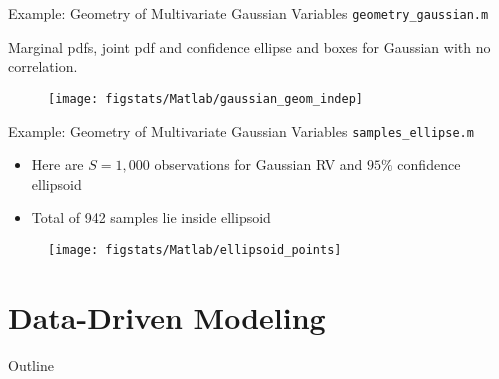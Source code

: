 \documentclass[9pt]{beamer}
\begin{document}
%
\begin{frame}{Example: Geometry of Multivariate Gaussian Variables \footnotesize{\texttt{geometry\_gaussian.m}}}

Marginal pdfs, joint pdf and confidence ellipse and boxes for Gaussian with no correlation. 
\begin{figure}[!htb]
    \centering
	\texttt{[image: figstats/Matlab/gaussian\_geom\_indep]}
\end{figure}

\end{frame}

%
\begin{frame}{Example: Geometry of Multivariate Gaussian Variables \footnotesize{\texttt{samples\_ellipse.m}}}

\begin{itemize}
\setlength{\itemsep}{5pt}
\item Here are $S=1,000$ observations for Gaussian RV and $95\%$ confidence ellipsoid
\item Total of 942 samples lie inside ellipsoid 
\end{itemize}
\begin{figure}[!htb]
    \centering
	\texttt{[image: figstats/Matlab/ellipsoid\_points]}
\end{figure}

\end{frame}

\section{Data-Driven Modeling}
\begin{frame}{Outline}
\tableofcontents[currentsection]
\end{frame}
\end{document}
